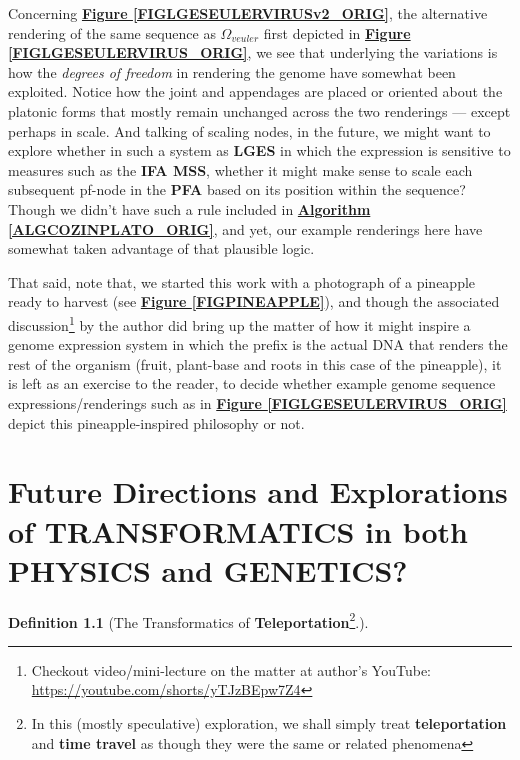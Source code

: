 \documentclass[a4paper, 18pt]{book} %
\newtheorem{defn}{Definition}
\begin{document}
\begin{appendices}
Concerning \textbf{\hyperref[FIGLGESEULERVIRUSv2_ORIG]{Figure \ref{FIGLGESEULERVIRUSv2_ORIG}}}, the alternative rendering  of the same sequence as $\Omega_{veuler}$ first depicted in \textbf{\hyperref[FIGLGESEULERVIRUS_ORIG]{Figure \ref{FIGLGESEULERVIRUS_ORIG}}}, we see that underlying the variations is how the \textit{degrees of freedom} in rendering the genome have somewhat been exploited. Notice how the joint and appendages are placed or oriented about the platonic forms that mostly remain unchanged across the two renderings --- except perhaps in scale. And talking of scaling nodes, in the future, we might want to explore whether in such a system as \textbf{LGES} in which the expression is sensitive to measures such as the \textbf{IFA MSS}, whether it might make sense to scale each subsequent pf-node in the \textbf{PFA} based on its position within the sequence? Though we didn't have such a rule included in \textbf{\hyperref[ALGCOZINPLATO_ORIG]{Algorithm \ref{ALGCOZINPLATO_ORIG}}}, and yet, our example renderings here have somewhat taken advantage of that plausible logic.

That said, note that, we started this work with a photograph of a pineapple ready to harvest (see \textbf{\hyperref[FIGPINEAPPLE]{Figure \ref{FIGPINEAPPLE}}}), and though the associated discussion\footnote{Checkout video/mini-lecture on the matter at author's YouTube: \url{https://youtube.com/shorts/yTJzBEpw7Z4}} by the author did bring up the matter of how it might inspire a genome expression system in which the prefix is the actual DNA that renders the rest of the organism (fruit, plant-base and roots in this case of the pineapple), it is left as an exercise to the reader, to decide whether example genome sequence expressions/renderings such as in \textbf{\hyperref[FIGLGESEULERVIRUS_ORIG]{Figure \ref{FIGLGESEULERVIRUS_ORIG}}} depict this pineapple-inspired philosophy or not.


\chapter{Future Directions and Explorations of TRANSFORMATICS in both PHYSICS and GENETICS?}
\label{SECFUTDIRECT}


\begin{defn}[The Transformatics of \textbf{Teleportation}\footnote{In this (mostly speculative) exploration, we shall simply treat \textbf{teleportation} and \textbf{time travel} as though they were the same or related phenomena}.]


\end{defn}
\end{appendices}
\end{document}
